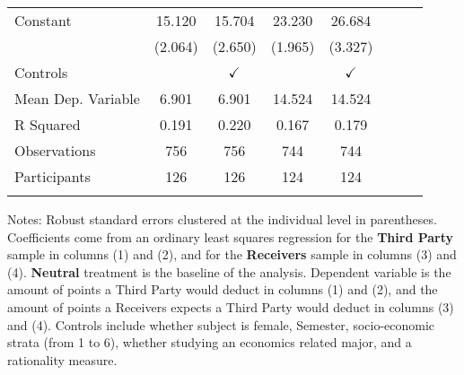 \begin{table}[H]
{\begin{threeparttable}
\begin{tabular}{lccccccc}
\addlinespace
Constant            &      15.120\sym{***}&      15.704\sym{***}&      23.230\sym{***}&      26.684\sym{***}\\
                    &     (2.064)         &     (2.650)         &     (1.965)         &     (3.327)         \\
\midrule
Controls            &                     &$\checkmark$         &                     &$\checkmark$         \\
\midrule
Mean Dep. Variable  &       6.901         &       6.901         &      14.524         &      14.524         \\
R Squared           &       0.191         &       0.220         &       0.167         &       0.179         \\
Observations        &         756         &         756         &         744         &         744         \\
Participants        &         126         &         126         &         124         &         124         \\
\bottomrule[0.5pt]                                                                               \label{tab:table2}                                                                       \end{tabular}                                                                                                    \vspace{-13pt}                                                                                           \begin{tablenotes}[flushleft]{\setlength{\itemindent}{-3pt}}          \small                                                                                                               \item Notes: Robust standard errors clustered at the individual level in parentheses. Coefficients come from an ordinary least squares regression for the \textbf{Third Party} sample in columns (1) and (2), and for the \textbf{Receivers} sample in columns (3) and (4). \textbf{Neutral} treatment is the baseline of the analysis. Dependent variable is the amount of points a Third Party would deduct in columns (1) and (2), and the amount of points a Receivers expects a Third Party would deduct in columns (3) and (4). Controls include whether subject is female, Semester, socio-economic strata (from 1 to 6), whether studying an economics related major, and a rationality measure.          \end{tablenotes}                                                                                         \end{threeparttable}                                                                             }                                                                                                                        \end{table}
